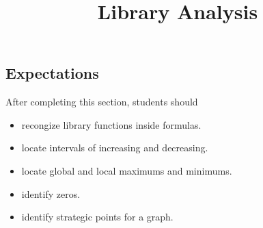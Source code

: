 \documentclass{ximera}
\title{Library Analysis}
\begin{document}
\begin{abstract}
\end{abstract}
\maketitle








\subsection{Expectations}

\begin{sectionOutcomes}
After completing this section, students should 

\begin{itemize}
\item recongize library functions inside formulas.
\item locate intervals of increasing and decreasing.
\item locate global and local maximums and minimums.
\item identify zeros.
\item identify strategic points for a graph.
\end{itemize}
\end{sectionOutcomes}
\end{document}
